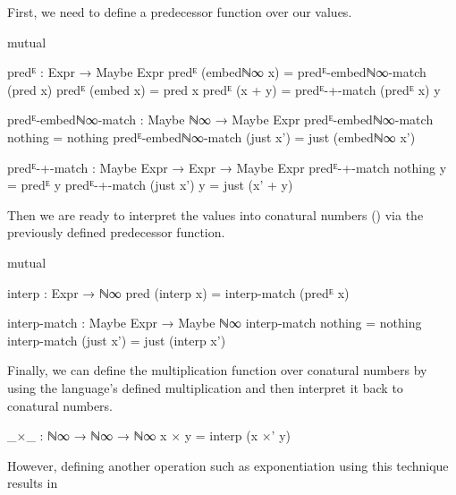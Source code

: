 First, we need to define a predecessor function over our  values.

\begin{code}[hide]
mutual
\end{code}
\begin{code}
  predᴱ : Expr → Maybe Expr
  predᴱ (embedℕ∞ x) = predᴱ-embedℕ∞-match (pred x)
  predᴱ (embed x) = pred x
  predᴱ (x + y) = predᴱ-+-match (predᴱ x) y

  predᴱ-embedℕ∞-match : Maybe ℕ∞ → Maybe Expr
  predᴱ-embedℕ∞-match nothing = nothing
  predᴱ-embedℕ∞-match (just x') = just (embedℕ∞ x')

  predᴱ-+-match : Maybe Expr → Expr → Maybe Expr
  predᴱ-+-match nothing y = predᴱ y
  predᴱ-+-match (just x') y = just (x' + y)
\end{code}

Then we are ready to interpret the  values into conatural numbers ()
via the previously defined predecessor function.

\begin{code}[hide]
mutual
\end{code}
\begin{code}
  interp : Expr → ℕ∞
  pred (interp x) = interp-match (predᴱ x)

  interp-match : Maybe Expr → Maybe ℕ∞
  interp-match nothing = nothing
  interp-match (just x') = just (interp x')
\end{code}

Finally, we can define the multiplication function over conatural numbers by using
the language's defined multiplication and then interpret it back to conatural numbers.

\begin{code}
_×_ : ℕ∞ → ℕ∞ → ℕ∞
x × y = interp (x ×' y)
\end{code}

However, defining another operation such as exponentiation using this technique results in 
